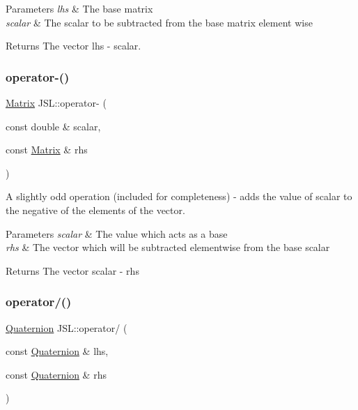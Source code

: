 \begin{DoxyParams}{Parameters}
{\em lhs} & The base matrix \\
\hline
{\em scalar} & The scalar to be subtracted from the base matrix element wise \\
\hline
\end{DoxyParams}
\begin{DoxyReturn}{Returns}
The vector lhs -\/ scalar. 
\end{DoxyReturn}
\mbox{\label{namespaceJSL_aebaffa5dc8073b816908a9708a36b7bf}} 
\subsubsection{\texorpdfstring{operator-\/()}{operator-()}\hspace{0.1cm}{\footnotesize\ttfamily [6/6]}}
{\footnotesize\ttfamily \hyperlink{classJSL_1_1Matrix}{Matrix} J\+S\+L\+::operator-\/ (\begin{DoxyParamCaption}\item[{const double \&}]{scalar,  }\item[{const \hyperlink{classJSL_1_1Matrix}{Matrix} \&}]{rhs }\end{DoxyParamCaption})\hspace{0.3cm}{\ttfamily [inline]}}



A slightly odd operation (included for completeness) -\/ adds the value of scalar to the negative of the elements of the vector. 


\begin{DoxyParams}{Parameters}
{\em scalar} & The value which acts as a base \\
\hline
{\em rhs} & The vector which will be subtracted elementwise from the base scalar \\
\hline
\end{DoxyParams}
\begin{DoxyReturn}{Returns}
The vector scalar -\/ rhs 
\end{DoxyReturn}
\mbox{\label{namespaceJSL_a68fed2d9fae3ec9612dd8e8282cf1336}} 
\subsubsection{\texorpdfstring{operator/()}{operator/()}\hspace{0.1cm}{\footnotesize\ttfamily [1/3]}}
{\footnotesize\ttfamily \hyperlink{classJSL_1_1Quaternion}{Quaternion} J\+S\+L\+::operator/ (\begin{DoxyParamCaption}\item[{const \hyperlink{classJSL_1_1Quaternion}{Quaternion} \&}]{lhs,  }\item[{const \hyperlink{classJSL_1_1Quaternion}{Quaternion} \&}]{rhs }\end{DoxyParamCaption})\hspace{0.3cm}{\ttfamily [inline]}}

